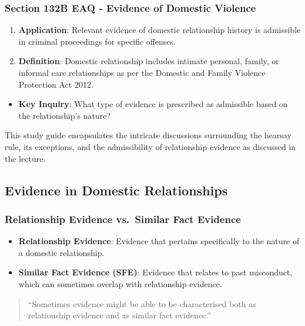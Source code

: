 \subsubsection{Section 132B EAQ - Evidence of Domestic
Violence}\label{section-132b-eaq---evidence-of-domestic-violence}

\begin{enumerate}
\def\labelenumi{\arabic{enumi}.}
\tightlist
\item
  \textbf{Application}: Relevant evidence of domestic relationship
  history is admissible in criminal proceedings for specific offenses.
\item
  \textbf{Definition}: Domestic relationship includes intimate personal,
  family, or informal care relationships as per the Domestic and Family
  Violence Protection Act 2012.
\end{enumerate}

\begin{itemize}
\tightlist
\item
  \textbf{Key Inquiry}: What type of evidence is prescribed as
  admissible based on the relationship's nature?
\end{itemize}

This study guide encapsulates the intricate discussions surrounding the
hearsay rule, its exceptions, and the admissibility of relationship
evidence as discussed in the lecture.

\subsection{  Evidence in Domestic
Relationships}\label{evidence-in-domestic-relationships}

\subsubsection{Relationship Evidence vs.~Similar Fact
Evidence}\label{relationship-evidence-vs.-similar-fact-evidence}

\begin{itemize}
\tightlist
\item
  \textbf{Relationship Evidence}: Evidence that pertains specifically to
  the nature of a domestic relationship.
\item
  \textbf{Similar Fact Evidence (SFE)}: Evidence that relates to past
  misconduct, which can sometimes overlap with relationship evidence.
\end{itemize}

\begin{quote}
``Sometimes evidence might be able to be characterised both as
relationship evidence and as similar fact evidence.''
\end{quote}

